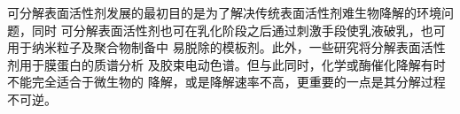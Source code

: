 \documentclass[bachelor,fandolfonts,replaceperiod]{jnuthesis} %
\begin{document}
    
        可分解表面活性剂发展的最初目的是为了解决传统表面活性剂难生物降解的环境问题，同时
    可分解表面活性剂也可在乳化阶段之后通过刺激手段使乳液破乳，也可用于纳米粒子及聚合物制备中
    易脱除的模板剂\cite{liu2007}。此外，一些研究将分解表面活性剂用于膜蛋白的质谱分析\cite{norris2003}
    及胶束电动色谱\cite{stanley2012}。但与此同时，化学或酶催化降解有时不能完全适合于微生物的
    降解\cite{tehrani2007}，或是降解速率不高，更重要的一点是其分解过程不可逆\cite{liu2007}。
    
\end{document}
